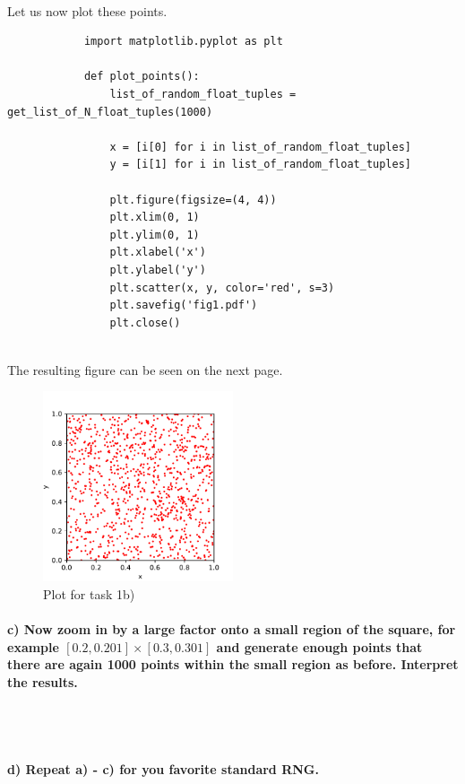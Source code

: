 \documentclass[11 pt]{article}
\begin{document}
        \\
        Let us now plot these points.
        \begin{lstlisting}
            import matplotlib.pyplot as plt

            def plot_points():
                list_of_random_float_tuples = get_list_of_N_float_tuples(1000)

                x = [i[0] for i in list_of_random_float_tuples]
                y = [i[1] for i in list_of_random_float_tuples]

                plt.figure(figsize=(4, 4))
                plt.xlim(0, 1)
                plt.ylim(0, 1)
                plt.xlabel('x')
                plt.ylabel('y')
                plt.scatter(x, y, color='red', s=3)
                plt.savefig('fig1.pdf')
                plt.close()\end{lstlisting} \ 
        \\
        The resulting figure can be seen on the next page.
        \newpage
        \begin{figure}[h!]
            \centering
            \includegraphics[width=0.5\textwidth]{./code/fig1.pdf} 
            \caption{Plot for task 1b)}
        \end{figure}


        \paragraph{c) Now zoom in by a large factor onto a small region of the 
            square, for example $[0.2,0.201]\times[0.3,0.301]$ and generate 
            enough points that there are again 1000 points within the small 
            region as before. Interpret the results.
        } \ \\
        \\ 

        \paragraph{d) Repeat a) - c) for you favorite standard RNG.}
\end{document}
